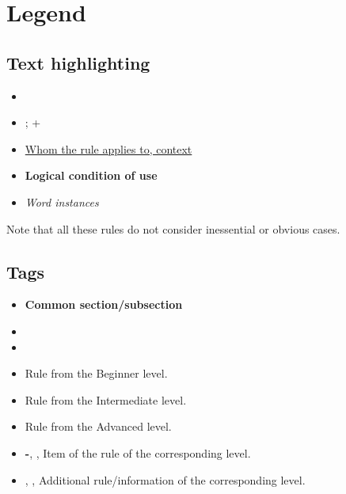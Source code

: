 \section*{Legend}
\label{sec:legend}

\subsection*{Text highlighting}
\begin{itemize}
    \item[\Rightarrow] 
    \item[\Rightarrow] ; +
    \item[\Rightarrow] \underline{Whom the rule applies to, context}
    \item[\Rightarrow] \textbf{Logical condition of use}
    \item[\Rightarrow] \textit{Word instances}
\end{itemize}
Note that all these rules do not consider inessential or obvious cases.

\subsection*{Tags}
\begin{itemize}
    \item[\Rightarrow] \textbf{\large Common section/subsection}
    \item[\Rightarrow] 
    \item[\Rightarrow] 
    \item[\Rightarrow] \textbullet{} Rule from the Beginner level.
    \item[\Rightarrow] \doot{} Rule from the Intermediate level.
    \item[\Rightarrow] \dooot{} Rule from the Advanced level.
    \item[\Rightarrow] \textbf{-}, \daash{}, \daaash{} Item of the rule of the corresponding level.
    \item[\Rightarrow] \ast{}, \aast{}, \aaast{} Additional rule/information of the corresponding level.
\end{itemize}